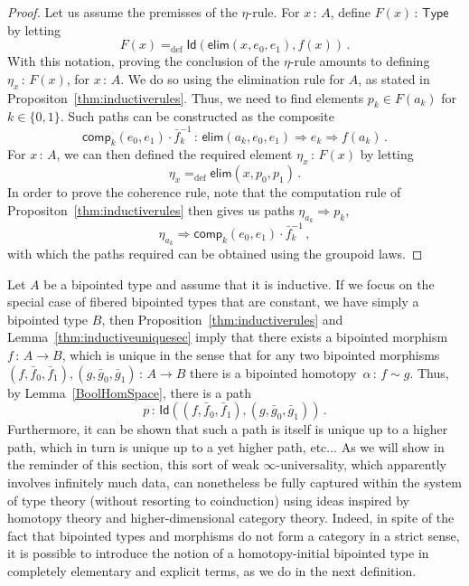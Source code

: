 \documentclass[10pt,a4paper,oneside,reqno]{amsart}
\theoremstyle{mythm}
\theoremstyle{mydef}
\theoremstyle{myrmk}
\newcommand{\ie}{\text{i.e.\ }}
\newcommand{\defeq}{=_{\mathrm{def}}}
\newcommand{\co}{\,{:}\,}
\newcommand{\type}{\mathsf{Type}}
\newcommand{\ct}{\cdot}
\newcommand{\Id}{\mathsf{Id}}
\newcommand{\elim}{\mathsf{elim}}
\newcommand{\comp}{\mathsf{comp}}
\begin{document}
\begin{proof} Let us assume the premisses of the $\eta$-rule. For $x \co A$, define $F(x) \co \type$  by letting~
\[
F(x) \defeq 
\Id( \elim(x, e_0, e_1), f(x)) \, .
\] 
With this notation, proving the conclusion of the $\eta$-rule amounts to defining
$\eta_x \co F(x)$, for $x \co A$. We do so using the elimination rule for $A$, as stated in Propositon~\ref{thm:inductiverules}.
Thus, we need to find elements $p_k \in F(a_k)$ for $k \in \{0, 1\}$. Such paths can be constructed as the composite
\[
\comp_k(e_0, e_1) \ct \bar{f}_k^{-1} \co  \elim(a_k, e_0, e_1) \Rightarrow e_k \Rightarrow f(a_k) \, .
\]
For $x \co A$, we can then defined the required element $\eta_x \co F(x)$ by letting 
\[
\eta_x \defeq \elim(x, p_0, p_1) \, . 
\]
In order to prove the coherence rule, note that the computation rule of Propositon~\ref{thm:inductiverules} then gives us 
paths $\eta_{a_k} \Rightarrow p_k$, \ie 
\[
\eta_{a_k} \Rightarrow \comp_k(e_0, e_1) \ct \bar{f}_k^{-1} \, , 
\]
with which the paths required  can be obtained using the groupoid laws.
 \end{proof} 
 
 \medskip
 
 Let $A$ be a bipointed type and assume that it is inductive. 
  If we focus on the special case of fibered bipointed types that 
are constant, \ie we have simply a bipointed type $B$, then 
 Proposition~\ref{thm:inductiverules} and Lemma~\ref{thm:inductiveuniquesec}
imply that there exists a bipointed morphism~$f \co A \to B$, which is unique in the sense that  for any two bipointed morphisms $(f, \bar{f}_0, \bar{f}_1), (g, \bar{g}_0, \bar{g}_1) \co A \to B$  there is a bipointed homotopy~$\alpha \co f \sim g$. Thus, by Lemma~\ref{BoolHomSpace}, there is a path 
\[
p \co \Id((f, \bar{f}_0, \bar{f}_1), (g, \bar{g}_0, \bar{g}_1)) \, .
\] 
Furthermore, it can be shown that such a path is itself is unique up to a higher path, which in turn is unique up to a yet higher path, etc... As we will show in the reminder of this section, this sort of weak $\infty$-universality, which apparently involves infinitely much data, can nonetheless be fully captured within the system of type theory (without resorting to coinduction) using ideas inspired by homotopy theory and higher-dimensional category theory. Indeed, in spite of the fact that bipointed types and morphisms do not form a category in a strict sense, it is possible to introduce the  notion of a homotopy-initial bipointed type in completely elementary and explicit terms, as we do in the next definition.
\end{document}
